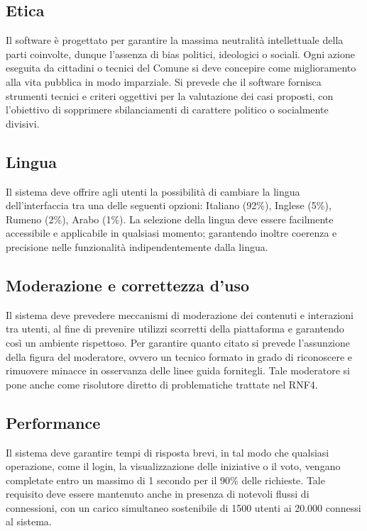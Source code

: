 \subsection{Etica}
Il software è progettato per garantire la massima neutralità intellettuale della parti coinvolte, dunque l'assenza di bias politici, ideologici o sociali. Ogni azione eseguita da cittadini o tecnici del Comune si deve concepire come miglioramento alla vita pubblica in modo imparziale. Si prevede che il software fornisca strumenti tecnici e criteri oggettivi per la valutazione dei casi proposti, con l'obiettivo di sopprimere sbilanciamenti di carattere politico o socialmente divisivi. 

\subsection{Lingua}
Il sistema deve offrire agli utenti la possibilità di cambiare la lingua dell’interfaccia tra una delle seguenti opzioni: Italiano (92{\%}), Inglese (5{\%}), Rumeno (2{\%}), Arabo (1{\%}). La selezione della lingua deve essere facilmente accessibile e applicabile in qualsiasi momento; garantendo inoltre coerenza e precisione nelle funzionalità indipendentemente dalla lingua.

\subsection{Moderazione e correttezza d'uso}
Il sistema deve prevedere meccanismi di moderazione dei contenuti e interazioni tra utenti, al fine di prevenire utilizzi scorretti della piattaforma e garantendo così un ambiente rispettoso. Per garantire quanto citato si prevede l'assunzione della figura del moderatore, ovvero un tecnico formato in grado di riconoscere e rimuovere minacce in osservanza delle linee guida fornitegli. Tale moderatore si pone anche come risolutore diretto di problematiche trattate nel RNF4.

\subsection{Performance}
Il sistema deve garantire tempi di risposta brevi, in tal modo che qualsiasi operazione, come il login, la visualizzazione delle iniziative o il voto, vengano completate entro un massimo di 1 secondo per il 90{\%} delle richieste. Tale requisito deve essere mantenuto anche in presenza di notevoli flussi di connessioni, con un carico simultaneo sostenibile di 1500 utenti ai 20.000 connessi al sistema.

